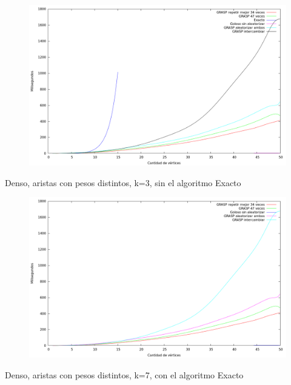 \begin{figure}[H]
  \begin{center}
    \includegraphics[scale=0.35]{imagenes/ej6-denso-pesos-distintos-k3-tiempo-exacto.png}
  \end{center}
\end{figure}

Denso, aristas con pesos distintos, k=3, sin el algoritmo Exacto

\begin{figure}[H]
  \begin{center}
    \includegraphics[scale=0.35]{imagenes/ej6-denso-pesos-distintos-k3-tiempo.png}
  \end{center}
\end{figure}

Denso, aristas con pesos distintos, k=7, con el algoritmo Exacto

